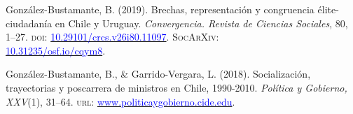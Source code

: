 \begin{publications}
\begin{benumerate}{9}
\item{González-Bustamante, B. (2019). Brechas, representación y congruencia élite-ciudadanía en Chile y Uruguay. {\itshape Convergencia. Revista de Ciencias Sociales}, 80, 1--27. {\scshape doi}: \href{https://doi.org/10.29101/crcs.v26i80.11097}{\textcolor{blue}{10.29101/crcs.v26i80.11097}}. {\scshape \footnotesize SocArXiv:} \\ \href{https://doi.org/10.31235/osf.io/cqym8}{\textcolor{blue}{10.31235/osf.io/cqym8}}.}\vspace{1mm} %


\item{González-Bustamante, B., \& Garrido-Vergara, L. (2018). Socialización, trayectorias y poscarrera de ministros en Chile, 1990-2010. {\itshape Política y Gobierno, XXV}(1), 31--64. {\scshape url:} \href{http://www.politicaygobierno.cide.edu/index.php/pyg/article/view/1080}{\textcolor{blue}{www.politicaygobierno.cide.edu}}.}\vspace{1mm}

\end{benumerate}

\end{publications}


